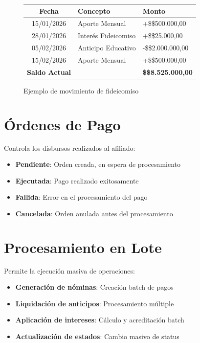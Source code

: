 \begin{figure}[H]
\begin{tcolorbox}[
    enhanced,
    colback=white,
    colframe=sandraDark,
    width=0.85\textwidth,
    halign=center
]
\begin{tabular}{cll}
\toprule
\textbf{Fecha} & \textbf{Concepto} & \textbf{Monto} \\
\midrule
15/01/2026 & Aporte Mensual & +\$\$500.000,00 \\
28/01/2026 & Interés Fideicomiso & +\$\$25.000,00 \\
05/02/2026 & Anticipo Educativo & -\$\$2.000.000,00 \\
15/02/2026 & Aporte Mensual & +\$\$500.000,00 \\
\midrule
\textbf{Saldo Actual} & & \textbf{\$\$8.525.000,00} \\
\bottomrule
\end{tabular}
\end{tcolorbox}
\caption{Ejemplo de movimiento de fideicomiso}
\label{fig:movimientos-ejemplo}
\end{figure}

\section{Órdenes de Pago}

Controla los disbursos realizados al afiliado:

\begin{itemize}[leftmargin=*]
    \item \textbf{Pendiente}: Orden creada, en espera de procesamiento
    \item \textbf{Ejecutada}: Pago realizado exitosamente
    \item \textbf{Fallida}: Error en el procesamiento del pago
    \item \textbf{Cancelada}: Orden anulada antes del procesamiento
\end{itemize}

\section{Procesamiento en Lote}

Permite la ejecución masiva de operaciones:

\begin{itemize}[leftmargin=*]
    \item \textbf{Generación de nóminas}: Creación batch de pagos
    \item \textbf{Liquidación de anticipos}: Procesamiento múltiple
    \item \textbf{Aplicación de intereses}: Cálculo y acreditación batch
    \item \textbf{Actualización de estados}: Cambio masivo de status
\end{itemize}

